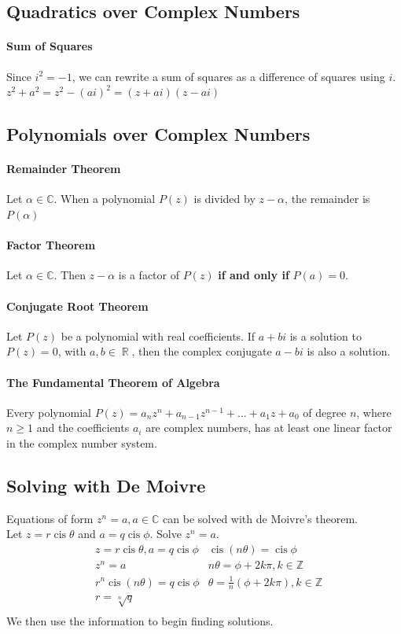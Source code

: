 \documentclass[a4paper,twoside]{article}
\DeclareMathOperator\cis{cis}
\DeclareMathOperator\R{\mathbb{R}}
\newenvironment{example}[1]{%
	\mbox{}\\\tcolorbox[beamer,breakable,%
		title=Example: #1,standard jigsaw,opacityback=0, colframe=blue!75!black]}{\endtcolorbox\mbox{}\\}
\begin{document}
		\subsection{Quadratics over Complex Numbers}
			\paragraph{Sum of Squares} Since $i^2=-1$, we can rewrite a sum of squares as a difference of squares using $i$. $z^2+a^2=z^2-(ai)^2=(z+ai)(z-ai)$
		\subsection{Polynomials over Complex Numbers}
			\paragraph{Remainder Theorem} Let $\alpha\in\mathbb{C}$. When a polynomial $P(z)$ is divided by $z-\alpha$, the remainder is $P(\alpha)$
			\paragraph{Factor Theorem} Let $\alpha\in\mathbb{C}$. Then $z-\alpha$ is a factor of $P(z)$ \textbf{if and only if} $P(a)=0$.
			\paragraph{Conjugate Root Theorem} Let $P(z)$ be a polynomial with real coefficients. If $a+bi$ is a solution to $P(z)=0$, with $a,b\in\R$, then the complex conjugate $a-bi$ is also a solution.
			\paragraph{The Fundamental Theorem of Algebra} Every polynomial $P(z)=a_nz^n+a_{n-1}z^{n-1}+...+a_1z+a_0$ of degree $n$, where $n\geq1$ and the coefficients $a_i$ are complex numbers, has at least one linear factor in the complex number system.
		\subsection{Solving with De Moivre}
			Equations of form $z^n=a,a\in\mathbb{C}$ can be solved with de Moivre's theorem.
			\begin{example}{de Moivre's theorem to solve basic case}
				Let $z=r\cis\theta$ and $a=q\cis\phi$. Solve $z^n=a$.
				\begin{align*}
					&z=r\cis\theta,a=q\cis\phi &\cis(n\theta)=\cis\phi\\
					&z^n=a &n\theta=\phi+2k\pi,k\in\mathbb{Z}\\
					&r^n\cis(n\theta)=q\cis\phi &\theta=\frac{1}{n} (\phi+2k\pi),k\in\mathbb{Z}\\
					&r=\sqrt[n]{q}\\
				\end{align*}
				We then use the information to begin finding solutions.
			\end{example}
		
\end{document}
